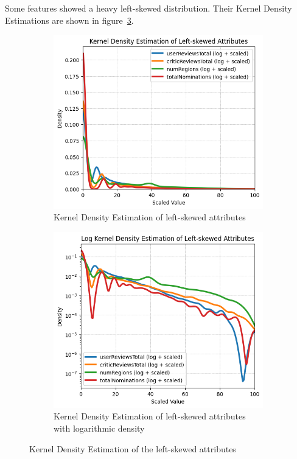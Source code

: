 Some features showed a heavy left-skewed distribution. Their Kernel Density Estimations are shown in figure~\ref{fig:left_skewed}.
\begin{figure}[H]
    \centering
    \begin{subfigure}{0.48\textwidth}
        \includegraphics[width=\textwidth]{plots/left_skew_distribs.png}
        \captionsetup{width=0.9\linewidth, justification=centering}
        \caption{Kernel Density Estimation of left-skewed attributes}
        \label{fig:sub1_KDE_left_skew}
    \end{subfigure}
    \begin{subfigure}{0.48\textwidth}
        \includegraphics[width=\textwidth]{plots/left_skew_distribs_log.png}
        \captionsetup{width=0.9\linewidth, justification=centering}
        \caption{Kernel Density Estimation of left-skewed attributes with logarithmic density}
        \label{fig:sub2_KDE_left_skew}
    \end{subfigure}
    \caption{Kernel Density Estimation of the left-skewed attributes}
    \label{fig:left_skewed}
\end{figure}

